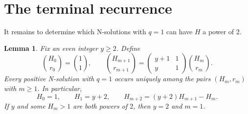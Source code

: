 \documentclass[11pt]{amsart}
\newtheorem{lemma}[theorem]{Lemma}
\theoremstyle{remark}
\begin{document}
\section{The terminal recurrence}

It remains to determine which N-solutions with $q=1$ can have $H$ a
power of $2$.

\begin{lemma}\label{lem:recurrence}
Fix an even integer $y\ge2$.  Define
\[
 \binom{H_0}{r_0}=\binom11,
 \qquad
 \binom{H_{m+1}}{r_{m+1}}
 =
 \begin{pmatrix}y+1&1\\ y&1\end{pmatrix}
 \binom{H_m}{r_m}.
\]
Every positive N-solution with $q=1$ occurs uniquely among the pairs
$(H_m,r_m)$ with $m\ge1$.  In particular,
\begin{equation}\label{eq:H-recurrence}
 H_0=1,
 \qquad H_1=y+2,
 \qquad H_{m+2}=(y+2)H_{m+1}-H_m.
\end{equation}
If $y$ and some $H_m>1$ are both powers of $2$, then $y=2$ and
$m=1$.
\end{lemma}
\end{document}
